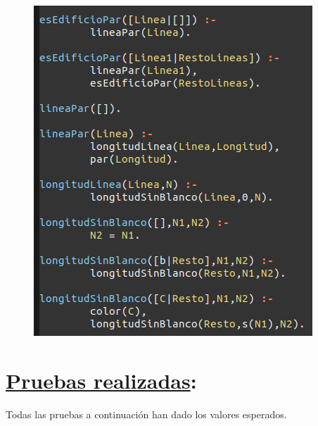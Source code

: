 \documentclass{article}
\begin{document}
\begin{enumerate}
\begin{figure}[H]
	\centering
	\includegraphics[width=0.75 \textwidth]{images/esEdificioPar.png}
\end{figure}


 

\end{enumerate}

\newpage

\section{\underline{Pruebas realizadas}:}

Todas las pruebas a continuación han dado los valores esperados.
\end{document}
